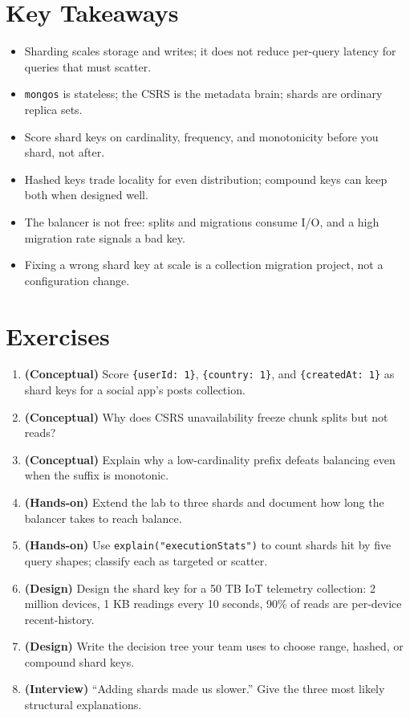 \section*{Key Takeaways}
\begin{itemize}
    \item Sharding scales storage and writes; it does not reduce per-query latency for queries that must scatter.
    \item \texttt{mongos} is stateless; the CSRS is the metadata brain; shards are ordinary replica sets.
    \item Score shard keys on cardinality, frequency, and monotonicity before you shard, not after.
    \item Hashed keys trade locality for even distribution; compound keys can keep both when designed well.
    \item The balancer is not free: splits and migrations consume I/O, and a high migration rate signals a bad key.
    \item Fixing a wrong shard key at scale is a collection migration project, not a configuration change.
\end{itemize}

\section{Exercises}
\begin{enumerate}
    \item \textbf{(Conceptual)} Score \texttt{\{userId: 1\}}, \texttt{\{country: 1\}}, and \texttt{\{createdAt: 1\}} as shard keys for a social app's posts collection.
    \item \textbf{(Conceptual)} Why does CSRS unavailability freeze chunk splits but not reads?
    \item \textbf{(Conceptual)} Explain why a low-cardinality prefix defeats balancing even when the suffix is monotonic.
    \item \textbf{(Hands-on)} Extend the lab to three shards and document how long the balancer takes to reach balance.
    \item \textbf{(Hands-on)} Use \texttt{explain("executionStats")} to count shards hit by five query shapes; classify each as targeted or scatter.
    \item \textbf{(Design)} Design the shard key for a 50 TB IoT telemetry collection: 2 million devices, 1 KB readings every 10 seconds, 90\% of reads are per-device recent-history.
    \item \textbf{(Design)} Write the decision tree your team uses to choose range, hashed, or compound shard keys.
    \item \textbf{(Interview)} ``Adding shards made us slower.'' Give the three most likely structural explanations.
\end{enumerate}

